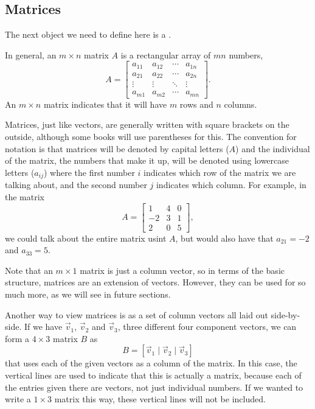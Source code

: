 \subsection{Matrices}

The next object we need to define here is a \emph{}. 
\begin{definition}
In general, an $m \times n$ matrix $A$ is a rectangular array of $mn$ numbers,
\[ A = \begin{bmatrix} a_{11} & a_{12} & \cdots & a_{1n} \\
a_{21} & a_{22} & \cdots & a_{2n} \\
\vdots & \vdots & \ddots & \vdots \\
a_{m1} & a_{m2} & \cdots & a_{mn}\end{bmatrix}. \] An $m \times n$ matrix indicates that it will have $m$ rows and $n$ columns. 
\end{definition}
Matrices, just like vectors, are generally written with square brackets on the outside, although some books will use parentheses for this. The convention for notation is that matrices will be denoted by capital letters ($A$) and the individual \emph{} of the matrix, the numbers that make it up, will be denoted using lowercase letters ($a_{ij}$) where the first number $i$ indicates which row of the matrix we are talking about, and the second number $j$ indicates which column. For example, in the matrix
\[ A = \begin{bmatrix} 1 & 4 & 0 \\ -2 & 3 & 1 \\ 2 & 0 & 5 \end{bmatrix}, \] we could talk about the entire matrix usint $A$, but would also have that $a_{21} = -2$ and $a_{33} = 5$. 

Note that an $m \times 1$ matrix is just a column vector, so in terms of the basic structure, matrices are an extension of vectors. However, they can be used for so much more, as we will see in future sections. 

Another way to view matrices is as a set of column vectors all laid out side-by-side. If we have $\vec{v}_1$, $\vec{v}_2$ and $\vec{v}_3$, three different four component vectors, we can form a $4\times 3$ matrix $B$ as
\[ B = \left[ \vec{v}_1 \mid \vec{v}_2 \mid \vec{v}_3 \right] \] that uses each of the given vectors as a column of the matrix. In this case, the vertical lines are used to indicate that this is actually a matrix, because each of the entries given there are vectors, not just individual numbers. If we wanted to write a $1 \times 3$ matrix this way, these vertical lines will not be included.

